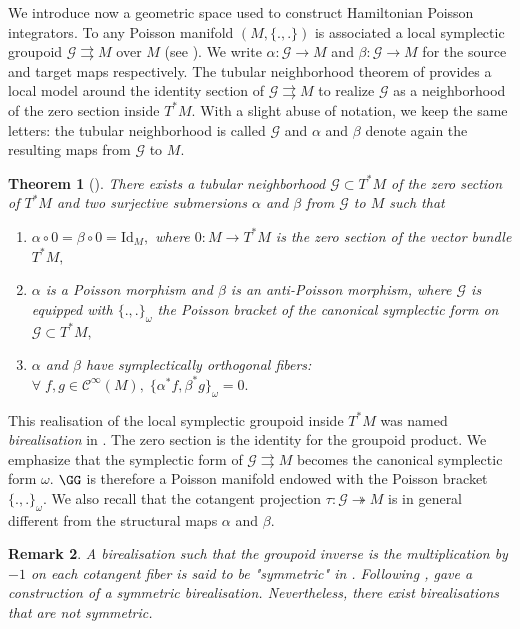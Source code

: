 \documentclass[a4paper,11pt]{article}
\newcommand{\func}[1]{\mathcal{C}^{\infty}(#1)}
\newcommand{\groupoid}{\mathcal{G} \rightrightarrows M}
\newtheorem{theorem}{Theorem}[section]
\newtheorem{remark}[theorem]{Remark}
\begin{document}
We introduce now a geometric space used to construct Hamiltonian Poisson integrators. To any Poisson manifold $(M, \{.,.\})$ is associated a local symplectic groupoid $\groupoid$ over $M$ (see \cite{Weinstein1987, Karasev1987}). We write $\alpha \colon \mathcal{G} \to M$ and $\beta \colon \mathcal{G} \to M$ for the source and target maps respectively. The tubular neighborhood theorem of \cite{Weinstein1971} provides a local model around the identity section of $\groupoid$ to realize $\mathcal{G}$ as a neighborhood of the zero section inside $T^*M.$ With a slight abuse of notation, we keep the same letters: the tubular neighborhood is called $\mathcal{G}$ and $\alpha$ and $\beta$ denote again the resulting maps from $\mathcal{G}$ to $M.$


\begin{theorem}[\cite{Karasev1987}]
There exists a tubular neighborhood $\mathcal{G} \subset T^*M$ of the zero section of $T^*M$ and two surjective submersions $\alpha$ and $\beta$ from $\mathcal{G}$ to $M$ such that
\begin{enumerate}
\item $\alpha \circ 0 = \beta \circ 0 = \text{Id}_M,$ where $0 \colon M \to T^*M$ is the zero section of the vector bundle $T^*M,$
\item $\alpha$ is a Poisson morphism and $\beta$ is an anti-Poisson morphism, where $\mathcal{G}$ is equipped with $\{.,.\}_{\omega}$ the Poisson bracket of the canonical symplectic form on $\mathcal{G} \subset T^*M,$
\item $\alpha$ and $\beta$ have symplectically orthogonal fibers: $\forall \; f,g \in \func{M}, \; \{ \alpha^*f, \beta^*g\}_{\omega} = 0.$ 
\end{enumerate}
\end{theorem}
This realisation of the local symplectic groupoid inside $T^*M$ was named \textit{birealisation} in \cite{oscar}. The zero section is the identity for the groupoid product. We emphasize that the symplectic form of $\groupoid$ becomes the canonical symplectic form $\omega.$  $\GG$ is therefore a Poisson manifold endowed with the Poisson bracket $\{.,.\}_{\omega}.$ We also recall that the cotangent projection $\tau \colon \mathcal{G} \twoheadrightarrow M$ is in general different from the structural maps $\alpha$ and $\beta.$ 
\begin{remark}
A birealisation such that the groupoid inverse is the multiplication by $-1$ on each cotangent fiber is said to be "symmetric" in \cite[rk 2.19]{Cattaneo2010}. Following \cite{Karasev1987}, \cite{cabrera2020} gave a construction of a symmetric birealisation. Nevertheless, there exist birealisations that are not symmetric.
\end{remark}
\end{document}

